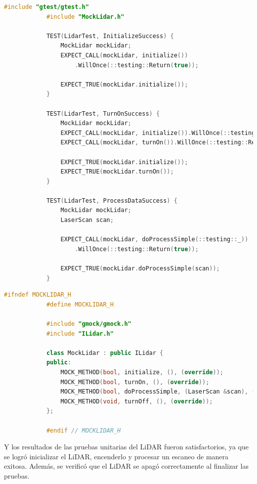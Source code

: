         \begin{lstlisting}[language={C++}, caption={LidarTest.cpp}, label={Script}]
            #include "gtest/gtest.h"
            #include "MockLidar.h"

            TEST(LidarTest, InitializeSuccess) {
                MockLidar mockLidar;
                EXPECT_CALL(mockLidar, initialize())
                    .WillOnce(::testing::Return(true));

                EXPECT_TRUE(mockLidar.initialize());
            }

            TEST(LidarTest, TurnOnSuccess) {
                MockLidar mockLidar;
                EXPECT_CALL(mockLidar, initialize()).WillOnce(::testing::Return(true));
                EXPECT_CALL(mockLidar, turnOn()).WillOnce(::testing::Return(true));

                EXPECT_TRUE(mockLidar.initialize());
                EXPECT_TRUE(mockLidar.turnOn());
            }

            TEST(LidarTest, ProcessDataSuccess) {
                MockLidar mockLidar;
                LaserScan scan;

                EXPECT_CALL(mockLidar, doProcessSimple(::testing::_))
                    .WillOnce(::testing::Return(true));

                EXPECT_TRUE(mockLidar.doProcessSimple(scan));
            }

        \end{lstlisting}
        \begin{lstlisting}[language={C++}, caption={MockLidar.h}, label={Script}]
            #ifndef MOCKLIDAR_H
            #define MOCKLIDAR_H

            #include "gmock/gmock.h"
            #include "ILidar.h"

            class MockLidar : public ILidar {
            public:
                MOCK_METHOD(bool, initialize, (), (override));
                MOCK_METHOD(bool, turnOn, (), (override));
                MOCK_METHOD(bool, doProcessSimple, (LaserScan &scan), (override));
                MOCK_METHOD(void, turnOff, (), (override));
            };

            #endif // MOCKLIDAR_H

        \end{lstlisting}
    \vskip 0.5cm
    Y los resultados de las pruebas unitarias del LiDAR fueron satisfactorios, ya que se logr\'o inicializar el LiDAR, encenderlo y procesar un escaneo
    de manera exitosa. Adem\'as, se verific\'o que el LiDAR se apag\'o correctamente al finalizar las pruebas.
